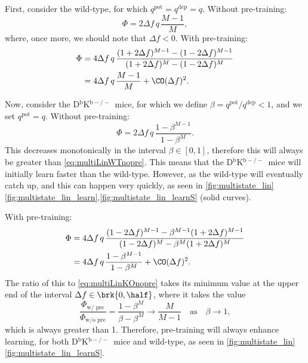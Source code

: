 \documentclass[12pt]{article}
\newcommand{\pot}{^{\text{pot}}}
\newcommand{\dep}{^{\text{dep}}}
\newcommand{\KO}{D$^\mathrm{b}$K$^{\mathrm{b}-/-}$}
\begin{document}
First, consider the wild-type, for which $q\pot=q\dep=q$.
Without pre-training:
%
\begin{equation}\label{eq:multiLinWTnopre}
  \Phi = 2{\Delta f}\,q\,\frac{M-1}{M},
\end{equation}
%
where, once more, we should note that $\Delta f<0$.
With pre-training:
%
\begin{equation}\label{eq:multiLinWTpre}
\begin{aligned}
  \Phi &= 4{\Delta f}\, q \, \frac{(1+2\Delta f)^{M-1} - (1-2\Delta f)^{M-1}}
          {(1+2\Delta f)^M - (1-2\Delta f)^M} \\
       &= {4{\Delta f}\, q}\,\frac{M-1}{M} + \CO(\Delta f)^2.
\end{aligned}
\end{equation}
%

Now, consider the \KO\ mice, for which we define $\beta=q\pot/q\dep<1$, and we set $q\pot=q$.
Without pre-training:
%
\begin{equation}\label{eq:multiLinKOnopre}
  \Phi = 2{\Delta f}\, q\,\frac{1-\beta^{M-1}}{1-\beta^M}.
\end{equation}
%
This decreases monotonically in the interval $\beta\in[0,1]$, therefore this will always be greater than \eqref{eq:multiLinWTnopre}.
This means that the \KO\ mice will initially learn faster than the wild-type.
However, as the wild-type will eventually catch up, and this can happen very quickly, as seen in \autoref{fig:multistate_lin}\ref{fig:multistate_lin_learn},\ref{fig:multistate_lin_learnS} (solid curves).

With pre-training:
%
\begin{equation}\label{eq:multiLinKOpre}
\begin{aligned}
  \Phi &= 4{\Delta f}\, q \, \frac{(1-2\Delta f)^{M-1} - \beta^{M-1}(1+2\Delta f)^{M-1}}
          {(1-2\Delta f)^M - \beta^M(1+2\Delta f)^M} \\
       &= 4{\Delta f}\, q\,\frac{1-\beta^{M-1}}{1-\beta^M} + \CO(\Delta f)^2.
\end{aligned}
\end{equation}
%
The ratio of this to \eqref{eq:multiLinKOnopre} takes its minimum value at the upper end of the interval $\Delta f \in \brk{0,\half}$, where it takes the value
%
\begin{equation}\label{eq:multiLinprenopre}
  \frac{\Phi_{\text{w/ pre}}}{\Phi_{\text{w/o pre}}} = \frac{1-\beta^M}{\beta-\beta^M}
   \longrightarrow \frac{M}{M-1} \quad \text{as} \quad \beta\to1,
\end{equation}
%
which is always greater than 1.
Therefore, pre-training will always enhance learning, for both \KO\ mice and wild-type, as seen in \autoref{fig:multistate_lin}\ref{fig:multistate_lin_learnS}.
\end{document}
